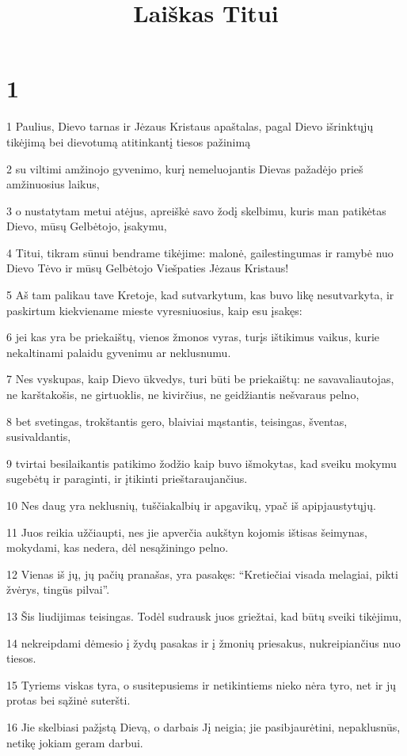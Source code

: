 

\title{Laiškas Titui}

\chapter{1}


\par 1 Paulius, Dievo tarnas ir Jėzaus Kristaus apaštalas, pagal Dievo išrinktųjų tikėjimą bei dievotumą atitinkantį tiesos pažinimą 
\par 2 su viltimi amžinojo gyvenimo, kurį nemeluojantis Dievas pažadėjo prieš amžinuosius laikus, 
\par 3 o nustatytam metui atėjus, apreiškė savo žodį skelbimu, kuris man patikėtas Dievo, mūsų Gelbėtojo, įsakymu,­ 
\par 4 Titui, tikram sūnui bendrame tikėjime: malonė, gailestingumas ir ramybė nuo Dievo Tėvo ir mūsų Gelbėtojo Viešpaties Jėzaus Kristaus! 
\par 5 Aš tam palikau tave Kretoje, kad sutvarkytum, kas buvo likę nesutvarkyta, ir paskirtum kiekviename mieste vyresniuosius, kaip esu įsakęs: 
\par 6 jei kas yra be priekaištų, vienos žmonos vyras, turįs ištikimus vaikus, kurie nekaltinami palaidu gyvenimu ar neklusnumu. 
\par 7 Nes vyskupas, kaip Dievo ūkvedys, turi būti be priekaištų: ne savavaliautojas, ne karštakošis, ne girtuoklis, ne kivirčius, ne geidžiantis nešvaraus pelno, 
\par 8 bet svetingas, trokštantis gero, blaiviai mąstantis, teisingas, šventas, susivaldantis, 
\par 9 tvirtai besilaikantis patikimo žodžio kaip buvo išmokytas, kad sveiku mokymu sugebėtų ir paraginti, ir įtikinti prieštaraujančius. 
\par 10 Nes daug yra neklusnių, tuščiakalbių ir apgavikų, ypač iš apipjaustytųjų. 
\par 11 Juos reikia užčiaupti, nes jie apverčia aukštyn kojomis ištisas šeimynas, mokydami, kas nedera, dėl nesąžiningo pelno. 
\par 12 Vienas iš jų, jų pačių pranašas, yra pasakęs: “Kretiečiai visada melagiai, pikti žvėrys, tingūs pilvai”. 
\par 13 Šis liudijimas teisingas. Todėl sudrausk juos griežtai, kad būtų sveiki tikėjimu, 
\par 14 nekreipdami dėmesio į žydų pasakas ir į žmonių priesakus, nukreipiančius nuo tiesos. 
\par 15 Tyriems viskas tyra, o susitepusiems ir netikintiems nieko nėra tyro, net ir jų protas bei sąžinė suteršti. 
\par 16 Jie skelbiasi pažįstą Dievą, o darbais Jį neigia; jie pasibjaurėtini, nepaklusnūs, netikę jokiam geram darbui.


